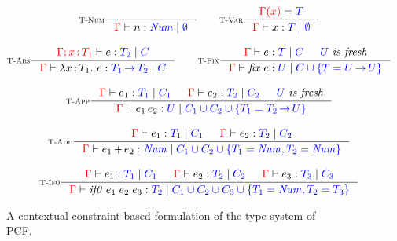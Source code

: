 \begin{figure}[t]
  \centering
  {
  \begin{gather*}
      \inference[\rulename{T-Num}]
        {}
        {\judgeC {\Gamma} {n} {\TNum} {\emptyset}}
\hskip2em 
      \inference[\rulename{T-Var}]
        {\ctxcolor{\Gamma(x)} = \typecolor{T}}
        {\judgeC {\Gamma} {x} {T} {\emptyset}}
\\[2ex]
      \inference[\rulename{T-Abs}]
        {\judgeC {\ctxplus{\Gamma}{x \ofType T_1}} {e} {T_2} {C}}
        {\judgeC \Gamma {\abs{x}{T_1}{e}} {T_1 \to T_2} {C}}
\hskip2em
      \inference[\rulename{T-Fix}]
        {\judgeC {\Gamma} {e} {T} {C} & \fresh{U}}
        {\judgeC \Gamma {\fix{e}} {U} {C \cup \{T = U \to U\}}}
\\[2ex]
      \inference[\rulename{T-App}]
        {\judgeC {\Gamma} {e_1} {T_1} {C_1} &
         \judgeC {\Gamma} {e_2} {T_2} {C_2} &
         \fresh{U}}
        {\judgeC \Gamma {\app{e_1}{e_2}} {U} {C_1 \cup C_2 \cup \{T_1 = T_2 \to U\}}}
\\[2ex]
      \inference[\rulename{T-Add}]
        {\judgeC {\Gamma} {e_1} {T_1} {C_1} &
         \judgeC {\Gamma} {e_2} {T_2} {C_2}}
        {\judgeC {\Gamma} {\add{e_1}{e_2}} {\TNum} {C_1 \cup C_2 \cup \{T_1 = \TNum, T_2 = \TNum\}}}
\\[2ex]
      \inference[\rulename{T-If0}]
        {\judgeC {\Gamma} {e_1} {T_1} {C_1} &
         \judgeC {\Gamma} {e_2} {T_2} {C_2} &
         \judgeC {\Gamma} {e_3} {T_3} {C_3}}
        {\judgeC {\Gamma} {\ifzero{e_1}{e_2}{e_3}} {T_2} {C_1 \cup C_2 \cup C_3 \cup \{T_1 = \TNum, T_2 = T_3\}}}
  \end{gather*}
  }
  \caption{A contextual constraint-based formulation of the type system of PCF.}
  \label{fig:pcf-original-constraint}
\end{figure}
